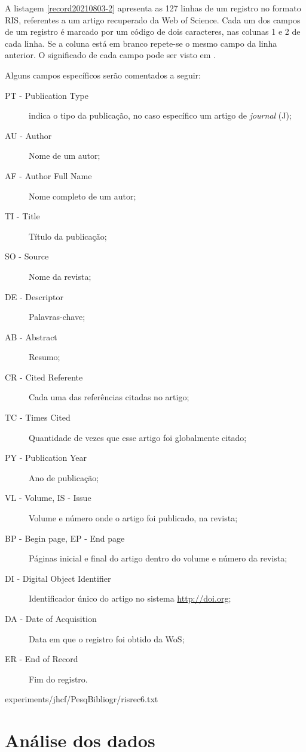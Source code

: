 A listagem \ref{record20210803-2} apresenta as 127 linhas de um registro no formato RIS, referentes a um artigo recuperado da Web of Science. Cada um dos campos de um registro é marcado por um código de dois caracteres, nas colunas 1 e 2 de cada linha. Se a coluna está em branco repete-se o mesmo campo da linha anterior.
O significado de cada campo pode ser visto em \citep{wikipedia_ris_2017}.

Alguns campos específicos serão comentados a seguir:
\begin{description}
    \item [PT - Publication Type] indica o tipo da publicação, no caso específico um artigo de \textit{journal} (J);
    \item [AU - Author] Nome de um autor;
    \item [AF - Author Full Name] Nome completo de um autor;
    \item [TI - Title] Título da publicação;
    \item [SO - Source] Nome da revista;
    \item [DE - Descriptor] Palavras-chave;
    \item [AB - Abstract] Resumo;
    \item [CR - Cited Referente] Cada uma das referências citadas no artigo;
    \item [TC - Times Cited] Quantidade de vezes que esse artigo foi globalmente citado;
    \item [PY - Publication Year] Ano de publicação;
    \item [VL - Volume, IS - Issue] Volume e número onde o artigo foi publicado, na revista;
    \item [BP - Begin page, EP - End page] Páginas inicial e final do artigo dentro do volume e número da revista;
    \item [DI - Digital Object Identifier] Identificador único do artigo no sistema \url{http://doi.org};
    \item [DA - Date of Acquisition] Data em que o registro foi obtido da WoS;
    \item [ER - End of Record] Fim do registro.
\end{description}


{experiments/jhcf/PesqBibliogr/risrec6.txt}

\section{Análise dos dados}

